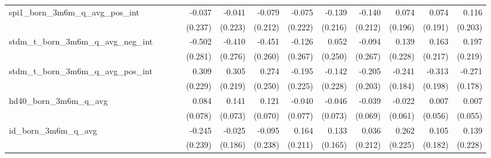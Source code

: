 \begin{tabular}{lrrrrrrrrrrrr}
spi1\_born\_3m6m\_q\_avg\_pos\_int          &              &              &              &       -0.037 &       -0.041 &       -0.079 &       -0.075 &       -0.139 &       -0.140 &        0.074 &        0.074 &        0.116 \\ 
                                            &              &              &              &      (0.237) &      (0.223) &      (0.212) &      (0.222) &      (0.216) &      (0.212) &      (0.196) &      (0.191) &      (0.203) \\ 
stdm\_t\_born\_3m6m\_q\_avg\_neg\_int       &              &              &              &       -0.502 &       -0.410 &       -0.451 &       -0.126 &        0.052 &       -0.094 &        0.139 &        0.163 &        0.197 \\ 
                                            &              &              &              &      (0.281) &      (0.276) &      (0.260) &      (0.267) &      (0.250) &      (0.267) &      (0.228) &      (0.217) &      (0.219) \\ 
stdm\_t\_born\_3m6m\_q\_avg\_pos\_int       &              &              &              &        0.309 &        0.305 &        0.274 &       -0.195 &       -0.142 &       -0.205 &       -0.241 &       -0.313 &       -0.271 \\ 
                                            &              &              &              &      (0.229) &      (0.219) &      (0.250) &      (0.225) &      (0.228) &      (0.203) &      (0.184) &      (0.198) &      (0.178) \\ 
hd40\_born\_3m6m\_q\_avg                    &              &              &              &        0.084 &        0.141 &        0.121 &       -0.040 &       -0.046 &       -0.039 &       -0.022 &        0.007 &        0.007 \\ 
                                            &              &              &              &      (0.078) &      (0.073) &      (0.070) &      (0.077) &      (0.073) &      (0.069) &      (0.061) &      (0.056) &      (0.055) \\ 
id\_born\_3m6m\_q\_avg                      &              &              &              &       -0.245 &       -0.025 &       -0.095 &        0.164 &        0.133 &        0.036 &        0.262 &        0.105 &        0.139 \\ 
                                            &              &              &              &      (0.239) &      (0.186) &      (0.238) &      (0.211) &      (0.165) &      (0.212) &      (0.225) &      (0.182) &      (0.228) \\ 

\end{tabular}
